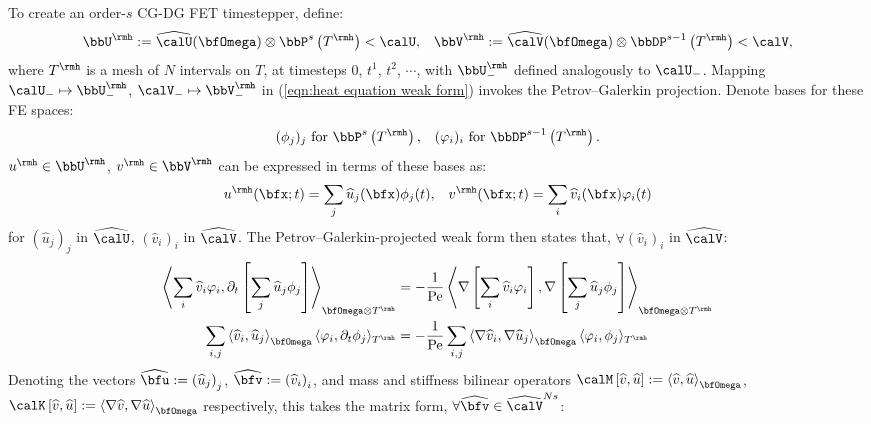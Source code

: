 \begin{example}
        To create an order-$s$ CG-DG FET timestepper, define:
        \begin{align}
            \bbU^{\rmh}  :=  \widehat{\calU}(\bfOmega)\otimes\bbP^{s}\left(T^{\rmh}\right)  <  \calU,  &&
            \bbV^{\rmh}  :=  \widehat{\calV}(\bfOmega)\otimes\bbDP^{s - 1}\left(T^{\rmh}\right)  <  \calV,
        \end{align}
        where $T^{\rmh}$ is a mesh of $N$ intervals on $T$, at timesteps $0$, $t^{1}$, $t^{2}$, $\cdots$, with $\bbU^{\rmh}_{-}$ defined analogously to $\calU_{-}$. Mapping $\calU_{-}  \mapsto  \bbU^{\rmh}_{-}$, $\calV_{-}  \mapsto  \bbV^{\rmh}_{-}$ in (\ref{eqn:heat equation weak form}) invokes the Petrov--Galerkin projection. Denote bases for these FE spaces:
        \begin{align}
            (\phi_{j})_{j}     \text{ for }  \bbP^{s}\left(T^{\rmh}\right),         &&
            (\varphi_{i})_{i}  \text{ for }  \bbDP^{s - 1}\left(T^{\rmh}\right).
        \end{align}
        $u^{\rmh}  \in  \bbU^{\rmh}$, $v^{\rmh}  \in  \bbV^{\rmh}$ can be expressed in terms of these bases as:
        \begin{align}
            u^{\rmh}(\bfx; t)  =  \sum_{j}\widehat{u}_{j}(\bfx)\phi_{j}(t),  &&
            v^{\rmh}(\bfx; t)  =  \sum_{i}\widehat{v}_{i}(\bfx)\varphi_{i}(t)
        \end{align}
        for $\left(\widehat{u}_{j}\right)_{j}$ in $\widehat{\calU}$, $\left(\widehat{v}_{i}\right)_{i}$ in $\widehat{\calV}$. The Petrov--Galerkin-projected weak form then states that, $\forall  \left(\widehat{v}_{i}\right)_{i}$ in $\widehat{\calV}$:
        \begin{align}
            \left\langle\sum_{i}\widehat{v}_{i}\varphi_{i}, \partial_{t}\left[\sum_{j}\widehat{u}_{j}\phi_{j}\right]\right\rangle_{\bfOmega\otimes T^{\rmh}}  &=  - \frac{1}{\rmPe}\left\langle\nabla\left[\sum_{i}\widehat{v}_{i}\varphi_{i}\right], \nabla\left[\sum_{j}\widehat{u}_{j}\phi_{j}\right]\right\rangle_{\bfOmega\otimes T^{\rmh}}  \\
            \sum_{i, j}\left\langle\widehat{v}_{i}, \widehat{u}_{j}\right\rangle_{\bfOmega}\langle\varphi_{i}, \partial_{t}\phi_{j}\rangle_{T^{\rmh}}  &=  - \frac{1}{\rmPe}\sum_{i, j}\left\langle\nabla\widehat{v}_{i}, \nabla\widehat{u}_{j}\right\rangle_{\bfOmega}\langle\varphi_{i}, \phi_{j}\rangle_{T^{\rmh}}
        \end{align}
        Denoting the vectors $\widehat{\bfu}  :=  \left(\widehat{u}_{j}\right)_{j}$, $\widehat{\bfv}  :=  \left(\widehat{v}_{i}\right)_{i}$, and mass and stiffness bilinear operators $\calM\left[\widehat{v}, \widehat{u}\right]  :=  \left\langle\widehat{v}, \widehat{u}\right\rangle_{\bfOmega}$, $\calK\left[\widehat{v}, \widehat{u}\right]  :=  \left\langle\nabla\widehat{v}, \nabla\widehat{u}\right\rangle_{\bfOmega}$ respectively, this takes the matrix form, $\forall  \widehat{\bfv}  \in  \widehat{\calV}^{Ns}$:

\end{example}
